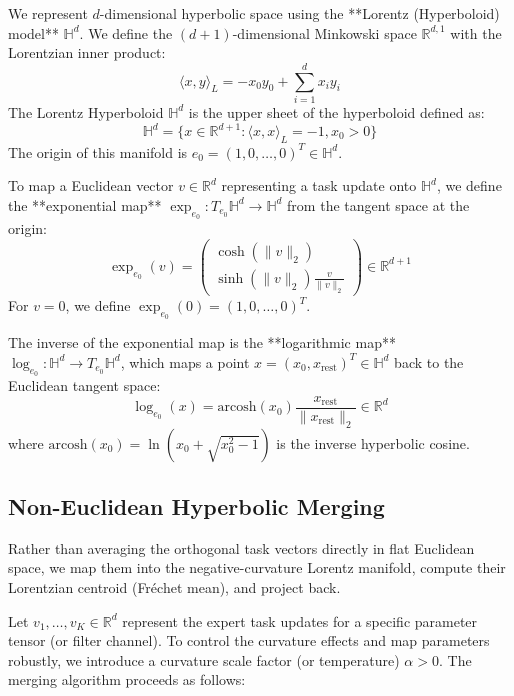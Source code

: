 \documentclass{article}
\theoremstyle{plain}
\theoremstyle{definition}
\theoremstyle{remark}
\begin{document}
We represent $d$-dimensional hyperbolic space using the **Lorentz (Hyperboloid) model** $\mathbb{H}^d$. We define the $(d+1)$-dimensional Minkowski space $\mathbb{R}^{d, 1}$ with the Lorentzian inner product:
\begin{equation}
\langle x, y \rangle_L = -x_0 y_0 + \sum_{i=1}^d x_i y_i
\end{equation}
The Lorentz Hyperboloid $\mathbb{H}^d$ is the upper sheet of the hyperboloid defined as:
\begin{equation}
\mathbb{H}^d = \{ x \in \mathbb{R}^{d+1} : \langle x, x \rangle_L = -1, x_0 > 0 \}
\end{equation}
The origin of this manifold is $e_0 = (1, 0, \dots, 0)^T \in \mathbb{H}^d$.

To map a Euclidean vector $v \in \mathbb{R}^d$ representing a task update onto $\mathbb{H}^d$, we define the **exponential map** $\exp_{e_0}: T_{e_0}\mathbb{H}^d \to \mathbb{H}^d$ from the tangent space at the origin:
\begin{equation}
\exp_{e_0}(v) = 
\begin{pmatrix} 
\cosh(\|v\|_2) \\ 
\sinh(\|v\|_2) \frac{v}{\|v\|_2} 
\end{pmatrix} \in \mathbb{R}^{d+1}
\end{equation}
For $v = 0$, we define $\exp_{e_0}(0) = (1, 0, \dots, 0)^T$.

The inverse of the exponential map is the **logarithmic map** $\log_{e_0}: \mathbb{H}^d \to T_{e_0}\mathbb{H}^d$, which maps a point $x = (x_0, x_{\text{rest}})^T \in \mathbb{H}^d$ back to the Euclidean tangent space:
\begin{equation}
\log_{e_0}(x) = \text{arcosh}(x_0) \frac{x_{\text{rest}}}{\|x_{\text{rest}}\|_2} \in \mathbb{R}^d
\end{equation}
where $\text{arcosh}(x_0) = \ln(x_0 + \sqrt{x_0^2 - 1})$ is the inverse hyperbolic cosine.

\subsection{Non-Euclidean Hyperbolic Merging}
Rather than averaging the orthogonal task vectors directly in flat Euclidean space, we map them into the negative-curvature Lorentz manifold, compute their Lorentzian centroid (Fréchet mean), and project back.

Let $v_1, \dots, v_K \in \mathbb{R}^d$ represent the expert task updates for a specific parameter tensor (or filter channel). To control the curvature effects and map parameters robustly, we introduce a curvature scale factor (or temperature) $\alpha > 0$. The merging algorithm proceeds as follows:
\end{document}
